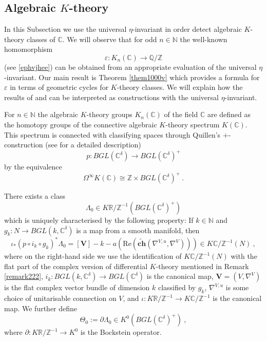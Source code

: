 \documentclass[12pt]{article}
\newcommand{\Ree}{\mathrm{Re}}
\newcommand{\nat}{{\mathbb{N}}}
\newcommand{\Z}{{\mathbb{Z}}}
\newcommand{\Q}{{\mathbb{Q}}}
\newcommand{\R}{{\mathbb{R}}}
\newcommand{\C}{{\mathbb{C}}}
\newcommand{\ch}{{\mathbf{ch}}}
\newcommand{\bV}{{\mathbf{V}}}
\newcommand{\bU}{{\mathbf{U}}}
\newcommand{\Dirac}{{D\hspace{-0.27cm}/}}
\begin{document}

\subsection{Algebraic $K$-theory}\label{alghhh}

In this Subsection we use the universal $\eta$-invariant in order detect algebraic $K$-theory classes of $\C$. We will observe that  for odd $n\in \nat$ the well-known homomorphism
$$\varepsilon:K_{n}(\C)\to \Q/\Z$$ (see \eqref{ephvjhee}) 
 can be obtained from an appropriate evaluation of the universal $\eta$-invariant. Our main result is
Theorem \ref{them1000v} which provides a  formula for $\varepsilon$ in terms of  geometric cycles for $K$-theory classes. 
We will explain how the results of \cite{MR0482758} and  \cite{westburyjones} can be interpreted as constructions with the universal $\eta$-invariant.

For $n\in \nat$ the algebraic $K$-theory groups $K_{n}(\C)$ of the field $\C$ are defined as the homotopy groups of the connective  algebraic $K$-theory spectrum $K(\C)$. This spectrum is connected with classifying spaces  through Quillen's $+$-construction (see \cite[Ch. 3]{MR505692} for a detailed description) 
  \begin{equation}\label{eq1350}p:BGL(\C^{\delta})\to BGL(\C^{\delta})^{+} \end{equation} by the
 equivalence \begin{equation}\label{theequivb}\Omega^{\infty}K(\C)\cong \Z\times BGL(\C^{\delta})^{+}\ .\end{equation}

There exists a class
$$\Lambda_{0}\in K\R/\Z^{-1}(BGL(\C^{\delta})^{+})$$ which is uniquely characterised by the following property: If $k\in \nat$ and $g_{k}:N\to BGL(k,\C^{\delta})$ is a map from a smooth manifold, then
$$\iota_{*}(p\circ i_{k}\circ g_{k})^{*}\Lambda_{0}=[\bV]-k-a(\Ree(\tilde \ch(\nabla^{V,u},\nabla^{V})))\in K\C/\Z^{-1}(N)\ , $$
where on the right-hand side we use the identification of $K\C/\Z^{-1}(N)$ with the flat part of the  complex version of differential $K$-theory mentioned in Remark \ref{remark222}, $i_{k}:BGL(k,\C^{\delta})\to BGL(\C^{\delta})$ is the canonical map,  $\bV=(V,\nabla^{V})$ is the flat complex vector bundle of dimension $k$ classified by $g_{k}$, $\nabla^{V,u}$ is some choice of unitarisable connection on $V$, and $\iota:K\R/\Z^{-1}\to K\C/\Z^{-1}$ is the canonical map.  
We further define
$$\Theta_{0}:=\partial \Lambda_{0}\in K^{0}(BGL(\C^{\delta})^{+})\ , $$
where    $\partial:K\R/\Z^{-1}\to K^{0}$ is the Bockstein operator.
\end{document}
